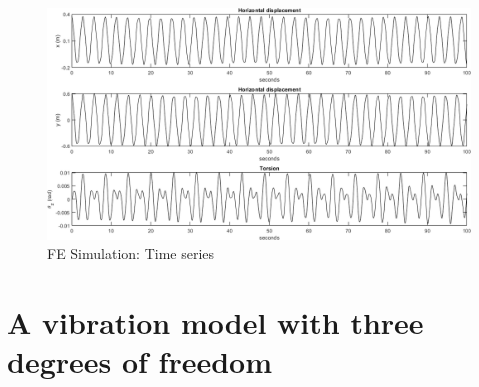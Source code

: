 \documentclass{article}
\begin{document}
\begin{figure}
    \centering
    \includegraphics[width=1\textwidth]{figures/OrbitDisplacemen.png}
    \caption{FE Simulation: Time series}
    \label{fig:fea:simres:timeseries}
\end{figure}








\clearpage

\section{A vibration model with three degrees of freedom}
\label{sec:3dof}
\end{document}
